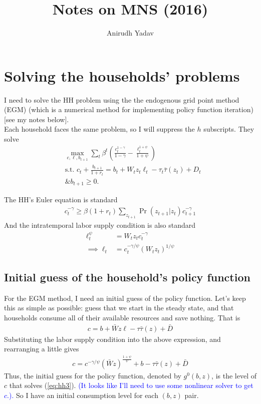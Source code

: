 \documentclass[12pt]{article}
\title{Notes on MNS (2016)}
\author{Anirudh Yadav}
\begin{document}
\maketitle


\section{Solving the households' problems}
I need to solve the HH problem using the the endogenous grid point method (EGM) (which is a numerical method for implementing policy function iteration) [see my notes below].\\

Each household faces the same problem, so I will suppress the $h$ subscripts. They solve
\begin{align*}
&\max_{c,\ell, b_{t+1}} \sum_t \beta^t \left(\frac{c_t^{1-\gamma}}{1-\gamma} - \frac{\ell_t^{1+\psi}}{1+\psi}\right)\\
&\text{s.t. } c_t + \frac{b_{t+1}}{1+r_t} = b_t + W_tz_t\ell_t - \tau_t\bar\tau(z_t) +D_t\\
&\text{\& } b_{t+1} \geq 0.
\end{align*}

The HH's Euler equation is standard
\begin{align}
c_t^{-\gamma} \geq \beta(1+r_t) \sum_{z_{t+1}}\Pr(z_{t+1}|z_t)c_{t+1}^{-\gamma}  \label{eq:hh1}
\end{align}
And the intratemporal labor supply condition is also standard
\begin{align}
\ell_t^\psi &= W_tz_tc_t^{-\gamma} \label{eq:hh2}\\
\implies  \ell_t&=c_t^{-\gamma/\psi}(W_tz_t)^{1/\psi}
\end{align}

\subsection{Initial guess of the household's policy function}
For the EGM method, I need an initial guess of the policy function. Let's keep this as simple as possible: guess that we start in the steady state, and that households consume all of their available resources and save nothing. That is
\begin{align*}
c =  b + \bar Wz\ell - \tau\bar\tau(z) +\bar D
\end{align*}
Substituting the labor supply condition into the above expression, and rearranging a little gives
\begin{align}
c = c^{-\gamma/\psi}(\bar Wz)^{\frac{1+\psi}{\psi}}+ b - \tau\bar\tau(z) +\bar D \label{eq:hh3}
\end{align}
Thus, the initial guess for the policy function, denoted by $g^0(b,z)$, is the level of $c$ that solves (\ref{eq:hh3}). \textcolor{blue}{(It looks like I'll need to use some nonlinear solver to get $c$.).} So I have an initial consumption level for each $(b,z)$ pair.
\end{document}
